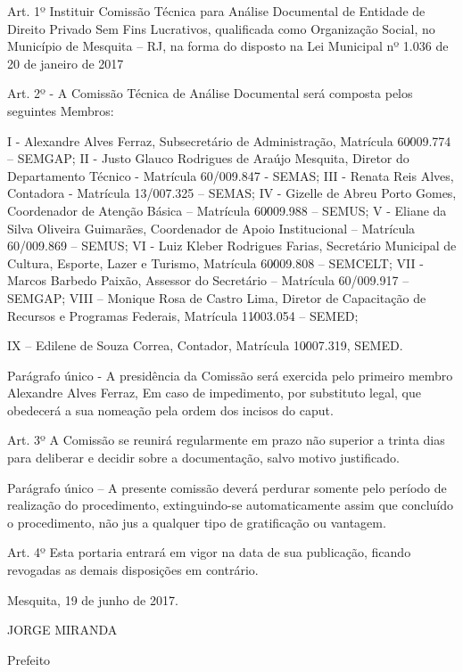 \documentclass{doliberto}
\begin{document}
Art.  1º 
Instituir  Comissão  Técnica  para  Análise 
Documental  de  Entidade  de  Direito  Privado  Sem  Fins 
Lucrativos,  qualificada  como  Organização  Social,  no 
Município  de  Mesquita  –  RJ,  na  forma  do  disposto  na  Lei 
Municipal nº 1.036 de 20 de janeiro de 2017 
 
Art.  2º  -  A  Comissão  Técnica  de  Análise  Documental  será 
composta pelos seguintes Membros: 
 
I   - Alexandre Alves Ferraz, Subsecretário de Administração, 
Matrícula 60∕009.774 – SEMGAP; 
II - Justo Glauco Rodrigues  de Araújo Mesquita, Diretor do 
Departamento Técnico - Matrícula 60/009.847 - SEMAS; 
III - Renata Reis Alves, Contadora - Matrícula 13/007.325 – 
SEMAS; 
IV - Gizelle de Abreu Porto Gomes, Coordenador de Atenção 
Básica – Matrícula 60∕009.988 – SEMUS; 
V - Eliane da Silva Oliveira Guimarães, Coordenador de Apoio 
Institucional – Matrícula 60/009.869 – SEMUS; 
VI  -  Luiz  Kleber  Rodrigues  Farias,  Secretário  Municipal  de 
Cultura,  Esporte,  Lazer  e  Turismo,  Matrícula  60∕009.808  – 
SEMCELT; 
VII  -  Marcos  Barbedo  Paixão,  Assessor  do  Secretário  – 
Matrícula 60/009.917 – SEMGAP; 
VIII – Monique Rosa de Castro Lima, Diretor de Capacitação 
de Recursos e Programas Federais, Matrícula 11∕003.054 – 
SEMED; 

IX  –  Edilene  de  Souza  Correa,  Contador,  Matrícula 
10∕007.319, SEMED. 
 
Parágrafo único - A presidência da Comissão será exercida 
pelo  primeiro membro  Alexandre Alves Ferraz, Em caso de 
impedimento,  por  substituto  legal,  que  obedecerá  a  sua 
nomeação pela ordem dos incisos do caput. 
 
Art. 3º A Comissão se  reunirá regularmente  em  prazo  não 
superior  a  trinta  dias  para  deliberar  e  decidir  sobre  a 
documentação, salvo motivo justificado. 
 
Parágrafo  único  –  A  presente  comissão  deverá  perdurar 
somente  pelo  período  de  realização  do  procedimento, 
extinguindo-se  automaticamente  assim  que  concluído  o 
procedimento,  não 
jus  a  qualquer  tipo  de 
gratificação ou vantagem. 
 
Art.  4º  Esta  portaria  entrará  em  vigor  na  data  de  sua 
publicação,  ficando  revogadas  as  demais  disposições  em 
contrário. 
 

Mesquita, 19 de junho de 2017. 

JORGE MIRANDA 

Prefeito
\end{document}
